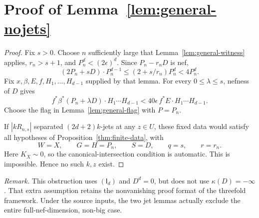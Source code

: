 \documentclass[12pt,a4paper,psamsfonts]{amsart}
\theoremstyle{definition}
\theoremstyle{plain}
\begin{document}
\section{Proof of Lemma~\ref{lem:general-nojets}}
\begin{proof}
Fix $s>0$. Choose $n$ sufficiently large that
Lemma~\ref{lem:general-witness} applies, $r_n>s+1$, and
$P_n^d<(2\epsilon)^d$. Since $P_n-r_nD$ is nef,
\[
 (2P_n+sD)\cdot P_n^{d-1}
 \le(2+s/r_n)P_n^d<4P_n^d.
\]
Fix $x,\beta,E,f,H_1,\ldots,H_{d-1}$ supplied by that lemma.
For every $0\le\lambda\le s$, nefness of $D$ gives
\[
 f^*\beta^*(P_n+\lambda D)\cdot H_1\cdots H_{d-1}
 <40\epsilon\,f^*E\cdot H_1\cdots H_{d-1}.
\]
Choose the flag in Lemma~\ref{lem:general-flag} with $P=P_n$.

If $|kR_{n,s}|$ separated $(2d+2)k$-jets at any $z\in U$,
these fixed data would satisfy all hypotheses of
Proposition~\ref{thm:finite-data}, with
\[
 W=X,\qquad G=H=P_n,\qquad S=D,\qquad q=s,\qquad r=r_n.
\]
Here $K_X\sim0$, so the canonical-intersection condition is
automatic. This is impossible. Hence no such $k,z$ exist.
\end{proof}

\medskip
\noindent\textit{Remark.}
This obstruction uses $(\mathsf I_d)$ and $D^d=0$, but does not
use $\kappa(D)=-\infty$. That extra assumption retains the
nonvanishing proof format of the threefold framework. Under
the source inputs, the two jet lemmas actually exclude the
entire full-nef-dimension, non-big case.
\end{document}
